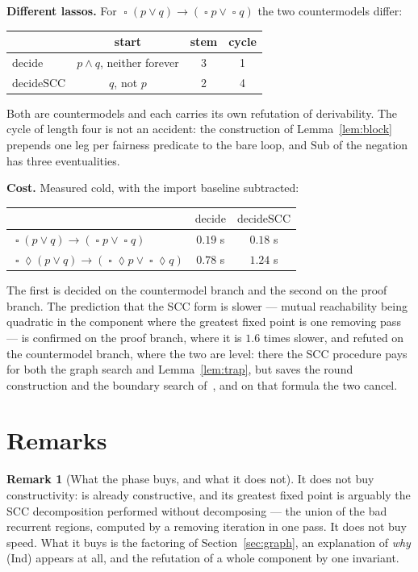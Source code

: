 \documentclass[11pt,a4paper]{article}
\theoremstyle{definition}
\newtheorem{remark}[theorem]{Remark}
\newcommand{\Always}{\mathop{\square}}
\newcommand{\Event}{\mathop{\lozenge}}
\newcommand{\Sub}{\mathrm{Sub}}
\begin{document}
\medskip\noindent\textbf{Different lassos.}  For
$\Always(p\vee q)\to(\Always p\vee\Always q)$ the two countermodels differ:
\begin{center}
\begin{tabular}{lccc}
              & start & stem & cycle\\\hline
$\mathrm{decide}$    & $p\wedge q$, neither forever & 3 & 1\\
$\mathrm{decideSCC}$ & $q$, not $p$                 & 2 & 4\\
\end{tabular}
\end{center}
Both are countermodels and each carries its own refutation of derivability.
The cycle of length four is not an accident: the construction of
Lemma~\ref{lem:block} prepends one leg per fairness predicate to the bare loop,
and $\Sub$ of the negation has three eventualities.

\medskip\noindent\textbf{Cost.}  Measured cold, with the import baseline
subtracted:
\begin{center}
\begin{tabular}{lcc}
   & $\mathrm{decide}$ & $\mathrm{decideSCC}$\\\hline
$\Always(p\vee q)\to(\Always p\vee\Always q)$ & $0.19$ s & $0.18$ s\\
$\Always\Event(p\vee q)\to(\Always\Event p\vee\Always\Event q)$
                                              & $0.78$ s & $1.24$ s\\
\end{tabular}
\end{center}
The first is decided on the countermodel branch and the second on the proof
branch.  The prediction that the SCC form is slower --- mutual reachability
being quadratic in the component where the greatest fixed point is one removing
pass --- is confirmed on the proof branch, where it is $1.6$ times slower, and
refuted on the countermodel branch, where the two are level: there the SCC
procedure pays for both the graph search and Lemma~\ref{lem:trap}, but saves
the round construction and the boundary search of~\cite[Prop.~5.3]{m4}, and on
that formula the two cancel.

\section{Remarks}

\begin{remark}[What the phase buys, and what it does not]
It does not buy constructivity: \cite{m4} is already constructive, and its
greatest fixed point is arguably the SCC decomposition performed without
decomposing --- the union of the bad recurrent regions, computed by a removing
iteration in one pass.  It does not buy speed.  What it buys is the factoring
of Section~\ref{sec:graph}, an explanation of \emph{why} (Ind) appears at all,
and the refutation of a whole component by one invariant.
\end{remark}
\end{document}
